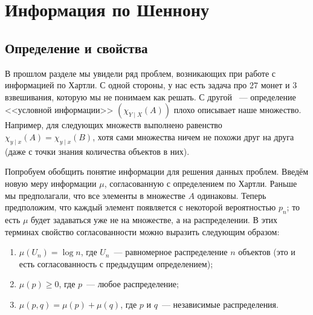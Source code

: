 \section{Информация по Шеннону}

\subsection{Определение и свойства}
В прошлом разделе мы увидели ряд проблем, возникающих при работе с информацией по Хартли. С одной
стороны, у нас есть задача про $27$ монет и $3$ взвешивания, которую мы не понимаем как решать. С другой~
--- определение <<условной информации>> $(\chi_{Y \mid X}(A))$ плохо описывает наше множество. Например, для
следующих множеств выполнено равенство $\chi_{y \mid x}(A) = \chi_{y \mid x}(B)$, хотя сами множества
ничем не похожи друг на друга (даже с точки знания количества объектов в них).  
\begin{figure}[h]
	\centering
	\begin{subfigure}[h]{0.4\textwidth}
        
		\caption{} 
	\end{subfigure}
	\qquad\qquad
	\begin{subfigure}[h]{0.4\textwidth}
        
		\caption{} 
	\end{subfigure}
\end{figure}

Попробуем обобщить понятие информации для решения данных проблем. Введём новую меру информации $\mu$,
согласованную с определением по Хартли. Раньше мы предполагали, что все элементы в множестве $A$
одинаковы. Теперь предположим, что каждый элемент появляется с некоторой вероятностью $p_n$; то есть
$\mu$ будет задаваться уже не на множестве, а на распределении. В этих терминах свойство согласованности
можно выразить следующим образом: 
\begin{enumerate}
    \item $\mu(U_n) = \log{n}$, где $U_n$~--- равномерное распределение $n$ объектов (это и есть
        согласованность с предыдущим определением);
    \item $\mu(p) \ge 0$, где $p$~--- любое распределение;
    \item $\mu(p, q) = \mu(p) + \mu(q)$, где $p$ и $q$~--- независимые  распределения.
\end{enumerate}

